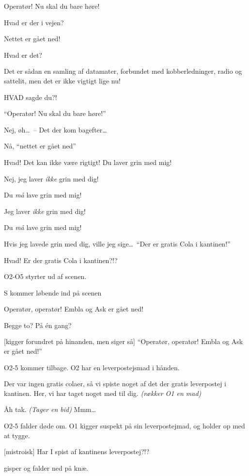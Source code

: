 \documentclass[danish]{article}
\begin{document}
\begin{sketch}
 Operatør! Nu skal du bare høre!

 Hvad er der i vejen?

 Nettet er gået ned!

 Hvad er det?

 Det er sådan en samling af datamater, forbundet med kobberledninger,
radio og sattelit, men det er ikke vigtigt lige nu!

 HVAD sagde du?!

 ``Operatør! Nu skal du bare høre!''

 Nej, øh\ldots\ -- Det der kom bagefter\ldots

 Nå, ``nettet er gået ned''

 Hvad! Det kan ikke være rigtigt! Du laver grin med mig!

 Nej, jeg laver \emph{ikke} grin med dig!

 Du \emph{må} lave grin med mig!

 Jeg laver \emph{ikke} grin med dig!

 Du \emph{må} lave grin med mig!

 Hvis jeg lavede grin med dig, ville jeg sige\ldots\ ``Der er gratis
Cola i kantinen!''

 Hvad! Er der gratis Cola i kantinen?!?

\scene O2-O5 styrter ud af scenen.

\scene S kommer løbende ind på scenen

 Operatør, operatør! Embla og Ask er gået ned!

 Begge to? På \'en gang?

[kigger forundret på hinanden, men siger så] ``Operatør, operatør! Embla og Ask er gået ned!''

\scene O2-5 kommer tilbage. O2 har en leverpostejsmad i hånden.

 Der var ingen gratis colaer, så vi spiste noget af det der gratis
leverpostej i kantinen. Her, vi har taget noget med til dig. \emph{(rækker O1 en
  mad)}

 Åh tak. \emph{(Tager en bid)} Mmm\ldots

\scene O2-5 falder døde om. O1 kigger suspekt på sin leverpostejmad, og holder op med at tygge.

[mistroisk] Har I spist af kantinens leverpostej?!?

 gisper og falder ned på knæ.


\end{sketch}
\end{document}

